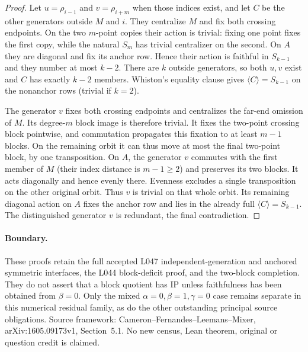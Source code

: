\documentclass[11pt,a4paper]{article}
\newcommand{\gen}[1]{\langle#1\rangle}
\begin{document}
\begin{proof}
Let $u=\rho_{i-1}$ and $v=\rho_{i+m}$ when those indices
exist, and let $C$ be the other generators outside $M$ and $i$.
They centralize $M$ and fix both crossing endpoints. On the
two $m$-point copies their action is trivial: fixing one
point fixes the first copy, while the natural $S_m$ has
trivial centralizer on the second. On $A$ they are diagonal
and fix its anchor row. Hence their action is faithful in
$S_{k-1}$ and they number at most $k-2$.
There are $k$ outside generators, so both $u,v$ exist and
$C$ has exactly $k-2$ members. Whiston's equality clause gives
$\gen C=S_{k-1}$ on the nonanchor rows (trivial if $k=2$).

The generator $v$ fixes both crossing endpoints and centralizes
the far-end omission of $M$. Its degree-$m$ block image is
therefore trivial. It fixes the two-point crossing block
pointwise, and commutation propagates this fixation to at
least $m-1$ blocks. On the remaining orbit it can thus move
at most the final two-point block, by one transposition.
On $A$, the generator $v$ commutes with the first member
of $M$ (their index distance is $m-1\geq2$) and preserves
its two blocks. It acts diagonally and hence evenly there.
Evenness excludes a single transposition on the other
original orbit. Thus $v$ is trivial on that whole orbit.
Its remaining diagonal action on $A$ fixes the anchor row
and lies in the already full $\gen C=S_{k-1}$.
The distinguished generator $v$ is redundant, the final
contradiction.
\end{proof}

\paragraph{Boundary.}
These proofs retain the full accepted L047 independent-generation
and anchored symmetric interfaces, the L044 block-deficit proof,
and the two-block completion. They do not assert that a block
quotient has IP unless faithfulness has been obtained from
$\beta=0$. Only the mixed $\alpha=0,\beta=1,\gamma=0$ case remains
separate in this numerical residual family, as do the
other outstanding principal source obligations. Source framework:
Cameron--Fernandes--Leemans--Mixer, arXiv:1605.09173v1, Section~5.1.
No new census, Lean theorem, original or question credit is claimed.
\end{document}
